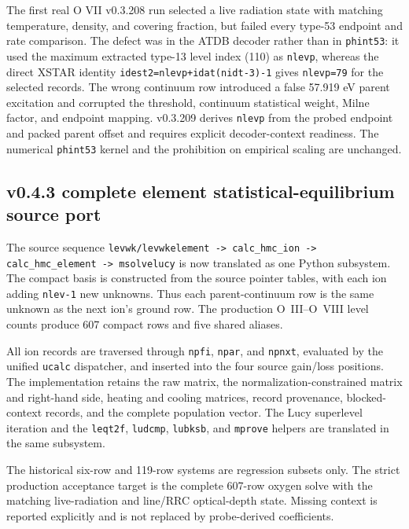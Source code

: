 \documentclass[
  10pt,
]{article}
\begin{document}
The first real O VII v0.3.208 run selected a live radiation state with matching temperature, density, and covering fraction, but failed every type-53 endpoint and rate comparison. The defect was in the ATDB decoder rather than in \texttt{phint53}: it used the maximum extracted type-13 level index (110) as \texttt{nlevp}, whereas the direct XSTAR identity \texttt{idest2=nlevp+idat(nidt-3)-1} gives \texttt{nlevp=79} for the selected records. The wrong continuum row introduced a false 57.919 eV parent excitation and corrupted the threshold, continuum statistical weight, Milne factor, and endpoint mapping. v0.3.209 derives \texttt{nlevp} from the probed endpoint and packed parent offset and requires explicit decoder-context readiness. The numerical \texttt{phint53} kernel and the prohibition on empirical scaling are unchanged.

\subsection{v0.4.3 complete element statistical-equilibrium source port}

The source sequence \texttt{levwk/levwkelement -> calc\_hmc\_ion ->
calc\_hmc\_element -> msolvelucy} is now translated as one Python subsystem.
The compact basis is constructed from the source pointer tables, with each ion
adding \texttt{nlev-1} new unknowns.  Thus each parent-continuum row is the same
unknown as the next ion's ground row.  The production O~III--O~VIII level counts
produce 607 compact rows and five shared aliases.

All ion records are traversed through \texttt{npfi}, \texttt{npar}, and
\texttt{npnxt}, evaluated by the unified \texttt{ucalc} dispatcher, and inserted
into the four source gain/loss positions.  The implementation retains the raw
matrix, the normalization-constrained matrix and right-hand side, heating and
cooling matrices, record provenance, blocked-context records, and the complete
population vector.  The Lucy superlevel iteration and the \texttt{leqt2f},
\texttt{ludcmp}, \texttt{lubksb}, and \texttt{mprove} helpers are translated in
the same subsystem.

The historical six-row and 119-row systems are regression subsets only.  The
strict production acceptance target is the complete 607-row oxygen solve with
the matching live-radiation and line/RRC optical-depth state.  Missing context
is reported explicitly and is not replaced by probe-derived coefficients.
\end{document}
